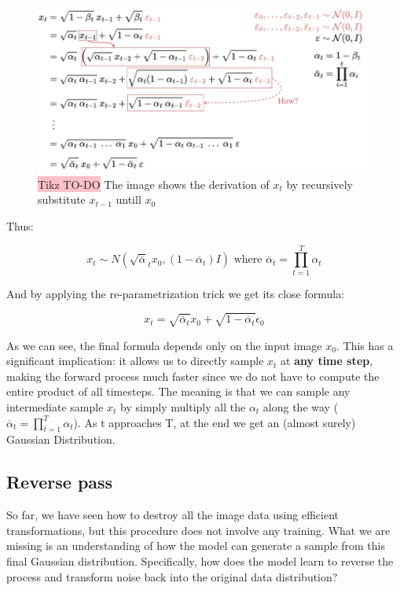 \begin{figure}[!htbp]
    \centering
    \includegraphics[width=1\linewidth]{tikz/diffusion model derivation.png}
    \caption{{\color{red}\colorbox{pink}{Tikz TO-DO}} The image shows the derivation of $x_t$ by recursively substitute $x_{t-1}$ untill $x_0$}
    \label{fig:enter-label}
\end{figure}

Thus:

$$x_t \sim N(\sqrt{\overline{\alpha}}_t x_0, (1- \overline{\alpha}_t)I) \text{   where } \overline{\alpha}_t = \prod_{t=1}^{T}\alpha_t$$

And by applying the re-parametrization trick we get its close formula:

$$x_t = \sqrt{\overline{\alpha}_t}x_{0} + \sqrt{1- \overline{\alpha}_t}\epsilon_0$$



As we can see, the final formula depends only on the input image $x_0$. This has a significant implication: it allows us to directly sample $x_t$ at \textbf{any time step}, making the forward process much faster since we do not have to compute the entire product of all timesteps. The meaning is that we can sample any intermediate sample $x_t$ by simply multiply all the $\alpha_{t}$ along the way ($\overline{\alpha}_t = \prod_{t=1}^{T}\alpha_t$). As t approaches T, at the end we get an (almost surely) Gaussian Distribution.


\subsection{Reverse pass}

So far, we have seen how to destroy all the image data using efficient transformations, but this procedure does not involve any training. What we are missing is an understanding of how the model can generate a sample from this final Gaussian distribution. Specifically, how does the model learn to reverse the process and transform noise back into the original data distribution?

